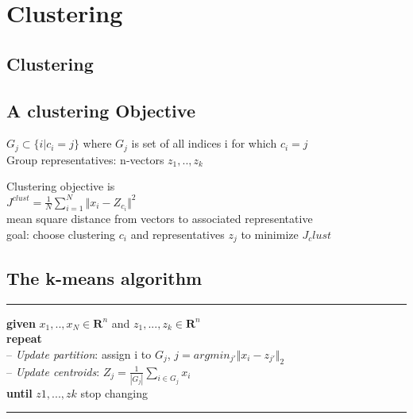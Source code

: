 \section{Clustering}

\subsection{Clustering}
\subsection{A clustering Objective}
$G_{j} \subset \{ i| c_{i}=j \}$ where $G_{j}$ is set of all indices i for which $c_{i}=j$\\
\textbullet Group representatives: n-vectors $z_1,..,z_k$

\textbullet Clustering objective is\\
$J^{clust} = \frac{1}{N} \sum_{i=1}^N\Vert x_i - Z_{c_i}\Vert^2$\\
\textbullet mean square distance from vectors to associated representative\\
\textbullet goal: choose clustering $c_i$ and representatives $z_j$
to minimize $J_clust$
\subsection{The k-means algorithm}
\rule{\linewidth}{0.4pt}
\textbf{given} $x_1,..,x_N \in \textbf{R}^n$ and $z_1,...,z_k \in \textbf{R}^n$\\
\textbf{repeat}\\
-- \textit{Update partition}: assign i to $G_j$, $j = argmin_{j'} \Vert x_i - z_{j'} \Vert_2$\\
-- \textit{Update centroids}: $Z_j = \frac{1}{|G_j|}\sum_{i \in G_j}x_i$\\
\textbf{until} $z1,...,zk$ stop changing\\
\rule{\linewidth}{0.4pt}


